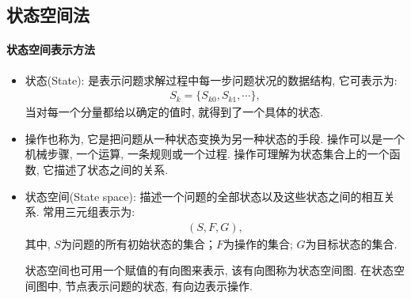 \subsection{状态空间法}
\paragraph{状态空间表示方法}
\begin{itemize}
\item 状态(State): 是表示问题求解过程中每一步问题状况的数据结构, 它可表示为:
\begin{align}
  S_k=\{S_{k0}, S_{k1}, \cdots\},
\end{align}
当对每一个分量都给以确定的值时, 就得到了一个具体的状态.

\item 操作也称为, 它是把问题从一种状态变换为另一种状态的手段.
操作可以是一个机械步骤, 一个运算, 一条规则或一个过程. 操作可理解为状态集合上的一个函数, 它描述了状态之间的关系.

\item 状态空间(State space): 描述一个问题的全部状态以及这些状态之间的相互关系. 常用三元组表示为:
\begin{align}
  (S, F, G),
\end{align}
其中, $S$为问题的所有初始状态的集合；$F$为操作的集合; $G$为目标状态的集合.

\begin{remark}
  状态空间也可用一个赋值的有向图来表示, 该有向图称为状态空间图. 在状态空间图中, 节点表示问题的状态, 有向边表示操作.
\end{remark}
\end{itemize}

